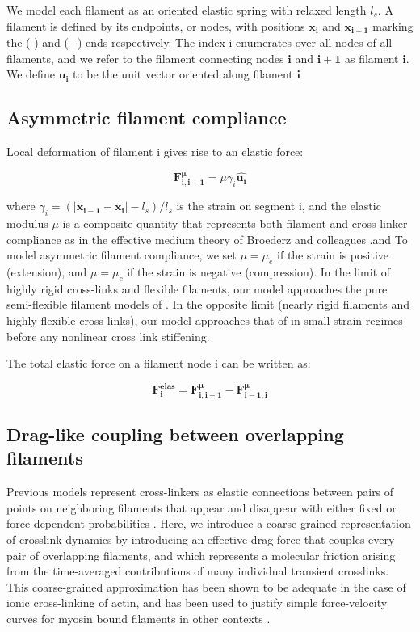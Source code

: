 \documentclass[10pt,letterpaper]{article}
\begin{document}
We model each filament as an oriented elastic spring with relaxed length $l_s$. A filament is defined by its endpoints, or nodes, with positions $\mathbf{x_i}$ and $\mathbf{x_{i+1}}$ marking the (-) and (+) ends respectively. The index i enumerates over all nodes of all filaments, and we refer to the filament connecting nodes $\mathbf{i}$ and $\mathbf{i+1}$ as filament $\mathbf{i}$.  We define $\mathbf{\hat{u_i}}$ to be the unit vector oriented along filament $\mathbf{i}$

\subsection*{Asymmetric filament compliance}
Local deformation of filament  i gives rise to an elastic force:

\begin{equation}
\label{eqn:spring}
\mathbf{F^{\mu}_{i,i+1}} = \mu \gamma_{i}  \mathbf{\hat{u_i}}
\end{equation}


where $ \gamma_{i} = (|\mathbf{x_{i-1}}-\mathbf{x_i}|-l_s)/l_s$ is the strain on segment i, and the elastic modulus  $\mu$ is a composite quantity that represents both filament and cross-linker compliance as in the effective medium theory of Broederz and colleagues \cite{theo_crosslinknonlinear}.and  To model asymmetric filament compliance, we set $\mu = \mu_e$ if the strain is positive (extension), and $\mu = \mu_c$ if the strain is negative (compression). In the limit of highly rigid cross-links and flexible filaments, our model approaches the pure semi-flexible filament models of \cite{theo_hlm,theo_hlm2}. In the opposite limit (nearly rigid filaments and highly flexible cross links), our model approaches that of \cite{theo_crosslinknonlinear} in small strain regimes before any nonlinear cross link stiffening. 

The total elastic force on a filament node i can be written as:

\begin{equation}
\label{eqn:internal}
\mathbf{F^{elas}_i} =  \mathbf{F^{\mu}_{i,i+1}} - \mathbf{F^{\mu}_{i-1,i}} 
\end{equation}

\subsection*{Drag-like coupling between overlapping filaments}
\label{exp_drag}
Previous models represent cross-linkers as elastic connections between pairs of points on neighboring filaments that appear and disappear with either fixed or force-dependent probabilities \cite{model_taeyoon,theo_crosslinknonlinear}.  Here, we introduce a coarse-grained representation of crosslink dynamics by introducing an effective drag force that couples every pair of overlapping filaments, and which represents a molecular friction arising from the time-averaged contributions of many individual transient crosslinks. This coarse-grained approximation has been shown to be adequate in the case of ionic cross-linking of actin\cite{mol_fric,theo_hydroish2}, and has been used to justify simple force-velocity curves for myosin bound filaments in other contexts \cite{theo_frictionShila}. 
\end{document}
